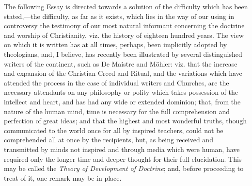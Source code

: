 The following Essay is directed towards a solution of
the difficulty which has been stated,—the
difficulty, as far as it exists, which lies in the way of
our using in controversy the testimony of our most
natural informant concerning the doctrine and worship of
Christianity, viz. the history of eighteen hundred years.
The view on which it is written has at all times,
perhaps, been implicitly adopted by theologians, and, I
believe, has recently been illustrated by several
distinguished writers of the continent, such as De
Maistre and Möhler: viz. that the increase and expansion
of the Christian Creed and Ritual, and the variations
which have attended the process in the case of individual
writers and Churches, are the necessary attendants on any
philosophy or polity which takes possession of the
intellect and heart, and has had any wide or extended
dominion; that, from the nature of the human mind, time
is necessary for the full comprehension and perfection of
great ideas; and that the highest and most wonderful
truths, though communicated to the world once for all by
inspired teachers, could not be comprehended all at once
by the recipients, but, as being received and transmitted
by minds not inspired and through media which were human,
have required only the longer time and deeper thought for
their full elucidation. This may be called the \emph{Theory
of Development of Doctrine}; and, before proceeding to
treat of it, one remark may be in place.

